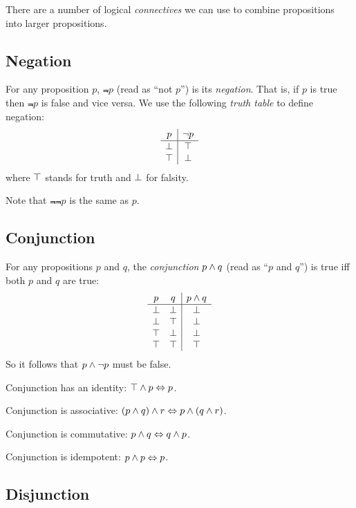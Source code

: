 There are a number of logical \emph{connectives} we can use to combine
propositions into larger propositions.

\subsection{Negation}

For any proposition $p$, $\Not{p}$ (read as ``not $p$'') is its
\emph{negation}.  That is, if $p$ is true then $\Not{p}$ is false and
vice versa.  We use the following \emph{truth table} to define negation:
\[
\begin{array}{c|c}
p       & \neg{}p \\
\hline
\perp  & \top  \\
\top   & \perp \\
\end{array}
\]
where $\top$ stands for truth and $\perp$ for falsity.

Note that $\Not{\Not{p}}$ is the same as $p$.

\subsection{Conjunction}

For any propositions $p$ and $q$, the \emph{conjunction} $p \wedge q$
(read as ``$p$ and $q$'') is true iff both $p$ and $q$ are true:
\[
\begin{array}{cc|c}
p       & q       & p \wedge q \\
\hline
\perp  & \perp  & \perp \\
\perp  & \top   & \perp \\
\top   & \perp  & \perp \\
\top   & \top   & \top \\
\end{array}
\]
So it follows that $p \wedge \neg{}p$ must be false.

Conjunction has an identity: $\top \wedge p \Leftrightarrow p$.

Conjunction is associative: $(p \wedge q) \wedge r \Leftrightarrow p \wedge (q \wedge r)$.

Conjunction is commutative: $p \wedge q \Leftrightarrow q \wedge p$.

Conjunction is idempotent: $p \wedge p \Leftrightarrow p$.

\subsection{Disjunction}

